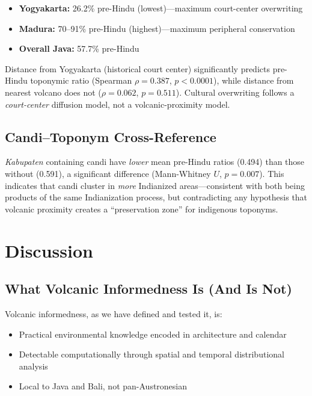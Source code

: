 \documentclass[12pt,a4paper]{article}
\begin{document}
\begin{itemize}
    \item \textbf{Yogyakarta:} 26.2\% pre-Hindu (lowest)---maximum court-center overwriting
    \item \textbf{Madura:} 70--91\% pre-Hindu (highest)---maximum peripheral conservation
    \item \textbf{Overall Java:} 57.7\% pre-Hindu
\end{itemize}

Distance from Yogyakarta (historical court center) significantly predicts pre-Hindu toponymic ratio (Spearman $\rho=0.387$, $p<0.0001$), while distance from nearest volcano does not ($\rho=0.062$, $p=0.511$). Cultural overwriting follows a \emph{court-center} diffusion model, not a volcanic-proximity model.

\subsection{Candi--Toponym Cross-Reference}

\emph{Kabupaten} containing candi have \emph{lower} mean pre-Hindu ratios (0.494) than those without (0.591), a significant difference (Mann-Whitney $U$, $p=0.007$). This indicates that candi cluster in \emph{more} Indianized areas---consistent with both being products of the same Indianization process, but contradicting any hypothesis that volcanic proximity creates a ``preservation zone'' for indigenous toponyms.

\section{Discussion}

\subsection{What Volcanic Informedness Is (And Is Not)}

Volcanic informedness, as we have defined and tested it, is:
\begin{itemize}
    \item Practical environmental knowledge encoded in architecture and calendar
    \item Detectable computationally through spatial and temporal distributional analysis
    \item Local to Java and Bali, not pan-Austronesian
\end{itemize}
\end{document}
